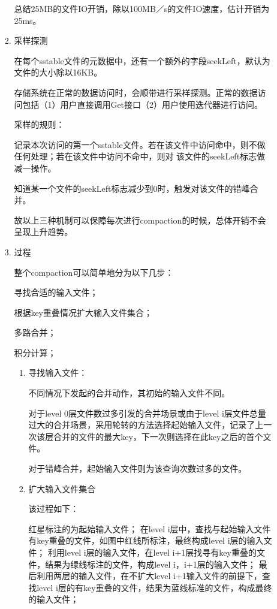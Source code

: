 \begin{enumerate}
\begin{enumerate}
\begin{enumerate}
				总结25MB的文件IO开销，除以100MB／s的文件IO速度，估计开销为25ms。
				
				\item 采样探测
				
				在每个sstable文件的元数据中，还有一个额外的字段seekLeft，默认为文件的大小除以16KB。
				
				存储系统在正常的数据访问时，会顺带进行采样探测。正常的数据访问包括（1）用户直接调用Get接口（2）用户使用迭代器进行访问。
				
				采样的规则：
				
				记录本次访问的第一个sstable文件。若在该文件中访问命中，则不做任何处理；若在该文件中访问不命中，则对 该文件的seekLeft标志做减一操作。
				
				知道某一个文件的seekLeft标志减少到0时，触发对该文件的错峰合并。
				
				故以上三种机制可以保障每次进行compaction的时候，总体开销不会呈现上升趋势。
				
				\item 过程
				
				整个compaction可以简单地分为以下几步：
				
				寻找合适的输入文件；

				根据key重叠情况扩大输入文件集合；
				
				多路合并；
				
				积分计算；
				
				\begin{enumerate}
					\item 寻找输入文件：
				
					不同情况下发起的合并动作，其初始的输入文件不同。
					
					对于level 0层文件数过多引发的合并场景或由于level i层文件总量过大的合并场景，采用轮转的方法选择起始输入文件，记录了上一次该层合并的文件的最大key，下一次则选择在此key之后的首个文件。
					
					对于错峰合并，起始输入文件则为该查询次数过多的文件。
					
					\item 扩大输入文件集合
					
					该过程如下：
					
					红星标注的为起始输入文件；
					在level i层中，查找与起始输入文件有key重叠的文件，如图中红线所标注，最终构成level i层的输入文件；
					利用level i层的输入文件，在level i+1层找寻有key重叠的文件，结果为绿线标注的文件，构成level i，i+1层的输入文件；
					最后利用两层的输入文件，在不扩大level i+1输入文件的前提下，查找level i层的有key重叠的文件，结果为蓝线标准的文件，构成最终的输入文件；
					


\end{enumerate}
\end{enumerate}
\end{enumerate}
\end{enumerate}
